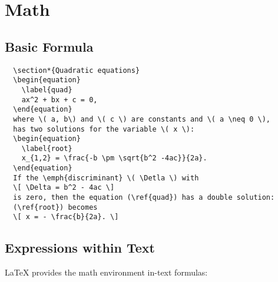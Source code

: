 \chapter{Math}

\section{Basic Formula}

\begin{lstlisting}
  \section*{Quadratic equations}
  \begin{equation}
    \label{quad}
    ax^2 + bx + c = 0,
  \end{equation}
  where \( a, b\) and \( c \) are constants and \( a \neq 0 \),
  has two solutions for the variable \( x \):
  \begin{equation}
    \label{root}
    x_{1,2} = \frac{-b \pm \sqrt{b^2 -4ac}}{2a}.
  \end{equation}
  If the \emph{discriminant} \( \Detla \) with
  \[ \Delta = b^2 - 4ac \]
  is zero, then the equation (\ref{quad}) has a double solution:
  (\ref{root}) becomes
  \[ x = - \frac{b}{2a}. \]
\end{lstlisting}




\section{Expressions within Text}
LaTeX provides the math environment in-text formulas:

